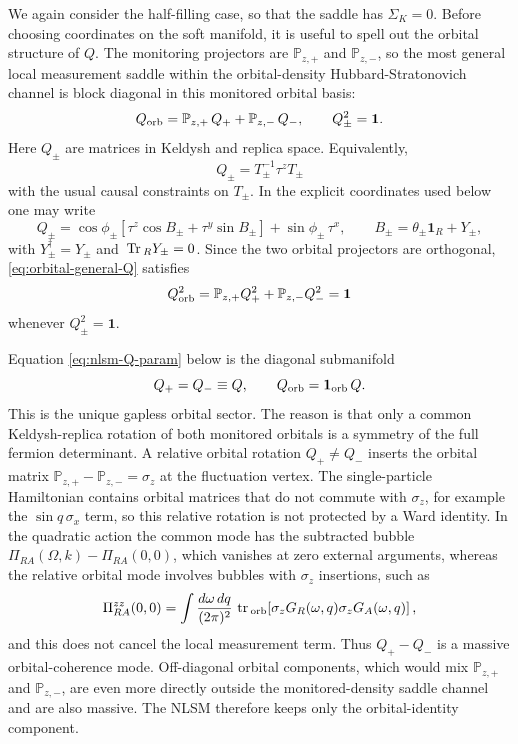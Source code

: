 \documentclass[aps,prx,preprint,amsmath,amssymb]{revtex4-2}
\newcommand{\Tr}{{\rm \, Tr\,}}
\newcommand{\tr}{{\rm \, tr\,}}
\begin{document}
We again consider the half-filling case, so that the saddle has
\(\Sigma_K=0\).  Before choosing coordinates on the soft manifold, it is useful
to spell out the orbital structure of \(Q\).  The monitoring projectors are
\(\mathbb P_{z,+}\) and \(\mathbb P_{z,-}\), so the most general local
measurement saddle within the orbital-density Hubbard-Stratonovich channel is
block diagonal in this monitored orbital basis:
\begin{equation}
\label{eq:orbital-general-Q}
Q_{\rm orb}
=
\mathbb P_{z,+}\,Q_+
+\mathbb P_{z,-}\,Q_-,
\qquad
Q_\pm^2=\mathbf{1}.
\end{equation}
Here \(Q_\pm\) are matrices in Keldysh and replica space.  Equivalently,
\[
Q_\pm=T_\pm^{-1}\tau^zT_\pm
\]
with the usual causal constraints on \(T_\pm\).  In the explicit coordinates
used below one may write
\begin{equation}
\label{eq:orbital-general-Qpm}
Q_\pm
=
\cos\phi_\pm
\left[\tau^z\cos B_\pm+\tau^y\sin B_\pm\right]
+\sin\phi_\pm\,\tau^x,
\qquad
B_\pm=\theta_\pm\mathbf{1}_R+Y_\pm,
\end{equation}
with \(Y_\pm^\dagger=Y_\pm\) and \(\Tr_RY_\pm=0\).  Since the two orbital
projectors are orthogonal, \eqref{eq:orbital-general-Q} satisfies
\[
Q_{\rm orb}^2
=
\mathbb P_{z,+}Q_+^2+\mathbb P_{z,-}Q_-^2
=\mathbf{1}
\]
whenever \(Q_\pm^2=\mathbf{1}\).

Equation \eqref{eq:nlsm-Q-param} below is the diagonal submanifold
\[
Q_+=Q_-\equiv Q,
\qquad
Q_{\rm orb}=\mathbf{1}_{\rm orb}\,Q.
\]
This is the unique gapless orbital sector.  The reason is that only a common
Keldysh-replica rotation of both monitored orbitals is a symmetry of the full
fermion determinant.  A relative orbital rotation \(Q_+\neq Q_-\) inserts the
orbital matrix \(\mathbb P_{z,+}-\mathbb P_{z,-}=\sigma_z\) at the fluctuation
vertex.  The single-particle Hamiltonian contains orbital matrices that do not
commute with \(\sigma_z\), for example the \(\sin q\,\sigma_x\) term, so this
relative rotation is not protected by a Ward identity.  In the quadratic action
the common mode has the subtracted bubble
\(\Pi_{RA}(\Omega,k)-\Pi_{RA}(0,0)\), which vanishes at zero external arguments,
whereas the relative orbital mode involves bubbles with \(\sigma_z\) insertions,
such as
\[
\Pi_{RA}^{zz}(0,0)
=
\int\frac{d\omega\,dq}{(2\pi)^2}\,
\tr_{\rm orb}\!\left[
\sigma_zG_R(\omega,q)\sigma_zG_A(\omega,q)
\right],
\]
and this does not cancel the local measurement term.  Thus \(Q_+-Q_-\) is a
massive orbital-coherence mode.  Off-diagonal orbital components, which would
mix \(\mathbb P_{z,+}\) and \(\mathbb P_{z,-}\), are even more directly outside
the monitored-density saddle channel and are also massive.  The NLSM therefore
keeps only the orbital-identity component.
\end{document}
